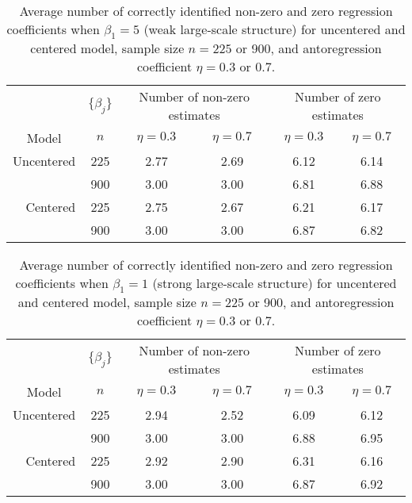 \documentclass[authoryear,review, 12pt]{elsarticle}
\begin{document}
\newpage
%
%
\begin{table}[!htbp]
\caption{Average number of correctly identified non-zero and zero regression coefficients when $\beta_1=5$ (weak large-scale structure) for uncentered and centered model, sample size $n=225$ or 900, and antoregression coefficient $\eta=0.3$ or 0.7.} %
\centering  %
\begin{tabular}{rccccc} %
\hline\hline                        %
& $\{\beta_j\}$ & \multicolumn{2}{c}{Number of non-zero estimates}  & \multicolumn{2}{c}{Number of zero estimates}\\ [0.5ex]  %
\multicolumn{1}{c}{Model} & $n$ & $\eta=0.3$ & $\eta=0.7$ & $\eta=0.3$ & $\eta=0.7$ \\
\hline                  %

Uncentered &  225  & 2.77 & 2.69 &  6.12 & 6.14 \\
 &  900  & 3.00 & 3.00 & 6.81 & 6.88\\
Centered &  225  & 2.75 & 2.67& 6.21  & 6.17\\ 
  &  900 & 3.00 & 3.00 & 6.87 & 6.82\\ [1ex]      %
\hline %
\end{tabular}
\label{tab:selstrong} %
\end{table}
 
\begin{table}[!htbp]
\caption{Average number of correctly identified non-zero and zero regression coefficients when $\beta_1=1$ (strong large-scale structure) for uncentered and centered model, sample size $n=225$ or 900, and antoregression coefficient $\eta=0.3$ or 0.7.} %
\centering  %
\begin{tabular}{rccccc} %
\hline\hline                        %
& $\{\beta_j\}$ & \multicolumn{2}{c}{Number of non-zero estimates}  & \multicolumn{2}{c}{Number of zero estimates}\\ [0.5ex]  %
\multicolumn{1}{c}{Model} & $n$ & $\eta=0.3$ & $\eta=0.7$ & $\eta=0.3$ & $\eta=0.7$ \\
\hline                  %
Uncentered &  225  & 2.94 & 2.52 & 6.09 & 6.12\\
 &  900  & 3.00 & 3.00 & 6.88 & 6.95\\
Centered  &  225 & 2.92 & 2.90 & 6.31 & 6.16\\ 
  &  900 & 3.00 & 3.00 & 6.87 & 6.92\\ [1ex]      %
\hline %
\end{tabular}
\label{tab:selweak} %
\end{table}
\end{document}
